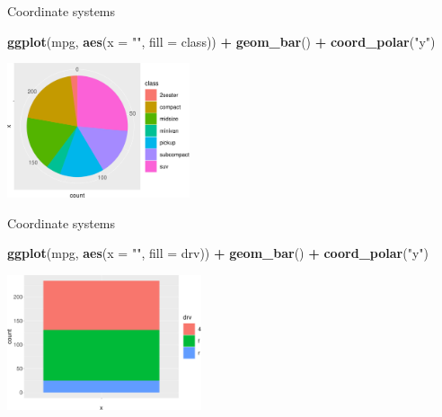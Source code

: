 \documentclass[ignorenonframetext,]{beamer}
\newenvironment{Shaded}{\begin{snugshade}}{\end{snugshade}}
\newcommand{\DataTypeTok}[1]{\textcolor[rgb]{0.13,0.29,0.53}{#1}}
\newcommand{\KeywordTok}[1]{\textcolor[rgb]{0.13,0.29,0.53}{\textbf{#1}}}
\newcommand{\NormalTok}[1]{#1}
\newcommand{\OperatorTok}[1]{\textcolor[rgb]{0.81,0.36,0.00}{\textbf{#1}}}
\newcommand{\StringTok}[1]{\textcolor[rgb]{0.31,0.60,0.02}{#1}}
\begin{document}
\begin{frame}[fragile]{Coordinate systems}
\protect\hypertarget{coordinate-systems-3}{}

\begin{Shaded}
\begin{Highlighting}[]
\KeywordTok{ggplot}\NormalTok{(mpg, }\KeywordTok{aes}\NormalTok{(}\DataTypeTok{x =} \StringTok{""}\NormalTok{, }\DataTypeTok{fill =}\NormalTok{ class)) }\OperatorTok{+}
\StringTok{  }\KeywordTok{geom_bar}\NormalTok{() }\OperatorTok{+}
\StringTok{  }\KeywordTok{coord_polar}\NormalTok{(}\StringTok{"y"}\NormalTok{)}
\end{Highlighting}
\end{Shaded}

\begin{center}\includegraphics[height=150px]{data-visualization_files/figure-beamer/unnamed-chunk-141-1} \end{center}

\end{frame}

\begin{frame}[fragile]{Coordinate systems}
\protect\hypertarget{coordinate-systems-4}{}

\begin{Shaded}
\begin{Highlighting}[]
\KeywordTok{ggplot}\NormalTok{(mpg, }\KeywordTok{aes}\NormalTok{(}\DataTypeTok{x =} \StringTok{""}\NormalTok{, }\DataTypeTok{fill =}\NormalTok{ drv)) }\OperatorTok{+}
\StringTok{  }\KeywordTok{geom_bar}\NormalTok{() }\OperatorTok{+}
\StringTok{  }\KeywordTok{coord_polar}\NormalTok{(}\StringTok{"y"}\NormalTok{)}
\end{Highlighting}
\end{Shaded}

\begin{center}\includegraphics[height=150px]{data-visualization_files/figure-beamer/unnamed-chunk-142-1} \end{center}

\end{frame}
\end{document}
